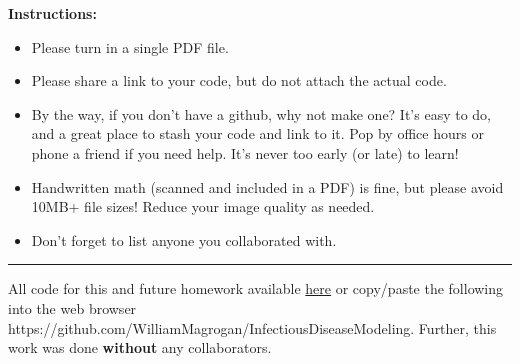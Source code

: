\documentclass[11pt]{article}
\begin{document}
\renewcommand{\headrulewidth}{0.4pt}

{\bf Instructions:} 
\begin{itemize}[itemsep=-7pt]
	\item Please turn in a single PDF file.
	\item Please share a link to your code, but do not attach the actual code. 
	\item {\color{blue} By the way, if you don't have a github, why not make one? It's easy to do, and a great place to stash your code and link to it. Pop by office hours or phone a friend if you need help. It's never too early (or late) to learn!} 
	\item Handwritten math (scanned and included in a PDF) is fine, but please avoid 10MB+ file sizes! Reduce your image quality as needed. 
	\item Don't forget to list anyone you collaborated with. 
\end{itemize}
\vspace{0.1in}\hrule


\begin{tcolorbox}[breakable]
	All code for this and future homework available \href{https://github.com/WilliamMagrogan/InfectiousDiseaseModeling}{here} or copy/paste the following into the web browser https://github.com/WilliamMagrogan/InfectiousDiseaseModeling. Further, this work was done \textbf{without} any collaborators.
\end{tcolorbox}
\end{document}
